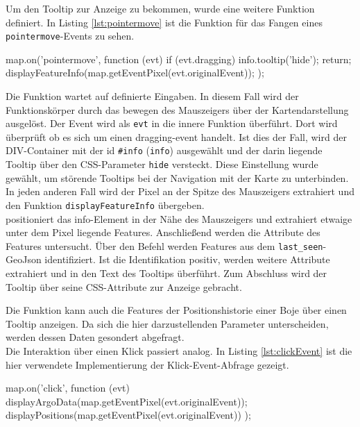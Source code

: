 Um den Tooltip zur Anzeige zu bekommen, wurde eine weitere Funktion definiert. In Listing \ref{lst:pointermove} ist die Funktion für das Fangen eines \texttt{pointermove}-Events zu sehen.
\begin{javascript}[label={lst:pointermove}, caption={Das Abfangen eines pointermove-Events}]
map.on('pointermove', function (evt) {
    if (evt.dragging) {
        info.tooltip('hide');
        return;
    }
    displayFeatureInfo(map.getEventPixel(evt.originalEvent));
});
\end{javascript}

Die Funktion wartet auf definierte Eingaben. In diesem Fall wird der Funktionskörper durch das bewegen des Mauszeigers über der Kartendarstellung ausgelöst. Der Event wird als \texttt{evt} in die innere Funktion überführt. Dort wird überprüft ob es sich um einen dragging-event handelt. Ist dies der Fall, wird der DIV-Container mit der id \texttt{\#info} (\texttt{info}) ausgewählt und der darin liegende Tooltip über den CSS-Parameter \texttt{hide} versteckt. Diese Einstellung wurde gewählt, um störende Tooltips bei der Navigation mit der Karte zu unterbinden. In jeden anderen Fall wird der Pixel an der Spitze des Mauszeigers extrahiert und den Funktion \texttt{displayFeatureInfo} übergeben.
\\
 positioniert das info-Element in der Nähe des Mauszeigers und extrahiert etwaige unter dem Pixel liegende Features. Anschließend werden die Attribute des Features untersucht. Über den Befehl  werden Features aus dem \texttt{last\_seen}-GeoJson identifiziert. Ist die Identifikation positiv, werden weitere Attribute extrahiert und in den Text des Tooltips überführt. Zum Abschluss wird der Tooltip über seine CSS-Attribute zur Anzeige gebracht.

Die Funktion kann auch die Features der Positionshistorie einer Boje über einen Tooltip anzeigen. Da sich die hier darzustellenden Parameter unterscheiden, werden dessen Daten gesondert abgefragt. 
\\

Die Interaktion über einen Klick passiert analog. In Listing \ref{lst:clickEvent} ist die hier verwendete Implementierung der Klick-Event-Abfrage gezeigt.
\begin{javascript}[label={lst:clickEvent}, caption={Das Abfangen eines Klick-Events}]
map.on('click', function (evt) {
    displayArgoData(map.getEventPixel(evt.originalEvent));
    displayPositions(map.getEventPixel(evt.originalEvent))
});
\end{javascript}

